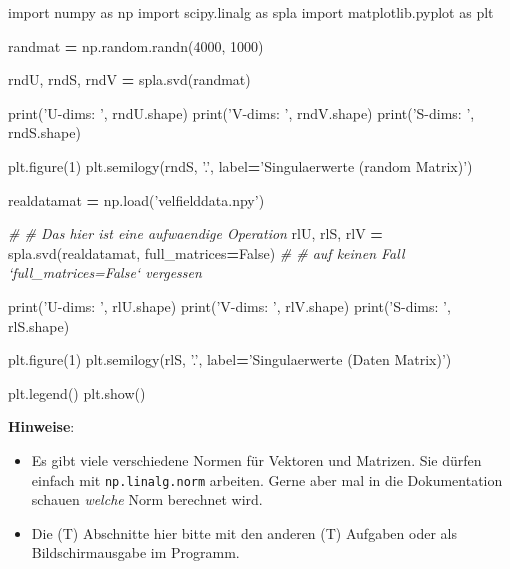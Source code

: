 \documentclass[]{book}
\newenvironment{Shaded}{\begin{snugshade}}{\end{snugshade}}
\newcommand{\BuiltInTok}[1]{#1}
\newcommand{\CommentTok}[1]{\textcolor[rgb]{0.56,0.35,0.01}{\textit{#1}}}
\newcommand{\DecValTok}[1]{\textcolor[rgb]{0.00,0.00,0.81}{#1}}
\newcommand{\ImportTok}[1]{#1}
\newcommand{\NormalTok}[1]{#1}
\newcommand{\OperatorTok}[1]{\textcolor[rgb]{0.81,0.36,0.00}{\textbf{#1}}}
\newcommand{\StringTok}[1]{\textcolor[rgb]{0.31,0.60,0.02}{#1}}
\newcommand{\VariableTok}[1]{\textcolor[rgb]{0.00,0.00,0.00}{#1}}
\providecommand{\tightlist}{%
  \setlength{\itemsep}{0pt}\setlength{\parskip}{0pt}}
\theoremstyle{definition}
\theoremstyle{definition}
\theoremstyle{definition}
\theoremstyle{definition}
\theoremstyle{remark}
\begin{document}
\begin{Shaded}
\begin{Highlighting}[]
\ImportTok{import}\NormalTok{ numpy }\ImportTok{as}\NormalTok{ np}
\ImportTok{import}\NormalTok{ scipy.linalg }\ImportTok{as}\NormalTok{ spla}
\ImportTok{import}\NormalTok{ matplotlib.pyplot }\ImportTok{as}\NormalTok{ plt}

\NormalTok{randmat }\OperatorTok{=}\NormalTok{ np.random.randn(}\DecValTok{4000}\NormalTok{, }\DecValTok{1000}\NormalTok{)}

\NormalTok{rndU, rndS, rndV }\OperatorTok{=}\NormalTok{ spla.svd(randmat)}

\BuiltInTok{print}\NormalTok{(}\StringTok{'U-dims: '}\NormalTok{, rndU.shape)}
\BuiltInTok{print}\NormalTok{(}\StringTok{'V-dims: '}\NormalTok{, rndV.shape)}
\BuiltInTok{print}\NormalTok{(}\StringTok{'S-dims: '}\NormalTok{, rndS.shape)}

\NormalTok{plt.figure(}\DecValTok{1}\NormalTok{)}
\NormalTok{plt.semilogy(rndS, }\StringTok{'.'}\NormalTok{, label}\OperatorTok{=}\StringTok{'Singulaerwerte (random Matrix)'}\NormalTok{)}

\NormalTok{realdatamat }\OperatorTok{=}\NormalTok{ np.load(}\StringTok{'velfielddata.npy'}\NormalTok{)}

\CommentTok{# # Das hier ist eine aufwaendige Operation}
\NormalTok{rlU, rlS, rlV }\OperatorTok{=}\NormalTok{ spla.svd(realdatamat, full_matrices}\OperatorTok{=}\VariableTok{False}\NormalTok{)}
\CommentTok{# # auf keinen Fall `full_matrices=False` vergessen}

\BuiltInTok{print}\NormalTok{(}\StringTok{'U-dims: '}\NormalTok{, rlU.shape)}
\BuiltInTok{print}\NormalTok{(}\StringTok{'V-dims: '}\NormalTok{, rlV.shape)}
\BuiltInTok{print}\NormalTok{(}\StringTok{'S-dims: '}\NormalTok{, rlS.shape)}

\NormalTok{plt.figure(}\DecValTok{1}\NormalTok{)}
\NormalTok{plt.semilogy(rlS, }\StringTok{'.'}\NormalTok{, label}\OperatorTok{=}\StringTok{'Singulaerwerte (Daten Matrix)'}\NormalTok{)}

\NormalTok{plt.legend()}
\NormalTok{plt.show()}
\end{Highlighting}
\end{Shaded}

\textbf{Hinweise}:

\begin{itemize}
\tightlist
\item
  Es gibt viele verschiedene Normen für Vektoren und Matrizen. Sie dürfen einfach mit \texttt{np.linalg.norm} arbeiten. Gerne aber mal in die Dokumentation schauen \emph{welche} Norm berechnet wird.
\item
  Die (T) Abschnitte hier bitte mit den anderen (T) Aufgaben oder als Bildschirmausgabe im Programm.
\end{itemize}
\end{document}
